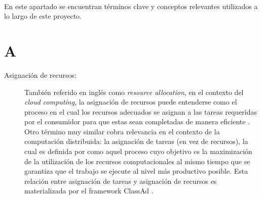 \label{cap:glosario}
\mbox{}\\
En este apartado se encuentran términos clave y conceptos relevantes utilizados a lo largo de este proyecto.

\section*{A}
\begin{description}
	\item[Asignación de recursos:] También referido en inglés como \textit{resource allocation}, en el contexto del \textit{cloud computing}, la asignación de recursos puede entenderse como el proceso en el cual los recursos adecuados se asignan a las tareas requeridas por el consumidor para que estas sean completadas de manera eficiente \citep{Manzoor2020}. Otro término muy similar cobra relevancia en el contexto de la computación distribuida: la asignación de tareas (en vez de recursos), la cual es definida por \cite{Chang1995} como aquel proceso cuyo objetivo es la maximización de la utilización de los recursos computacionales al mismo tiempo que se garantiza que el trabajo se ejecute al nivel más productivo posible. Esta relación entre asignación de tareas y asignación de recursos es materializada por el framework ClassAd \citep{Thain2005}.
\end{description}


